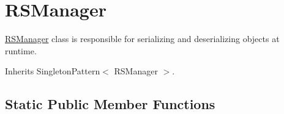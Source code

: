 \hypertarget{class_voxel_busters_1_1_runtime_serialization_1_1_r_s_manager}{}\section{R\+S\+Manager}
\label{class_voxel_busters_1_1_runtime_serialization_1_1_r_s_manager}


\hyperlink{class_voxel_busters_1_1_runtime_serialization_1_1_r_s_manager}{R\+S\+Manager} class is responsible for serializing and deserializing objects at runtime.  




Inherits Singleton\+Pattern$<$ R\+S\+Manager $>$.

\subsection*{Static Public Member Functions}
